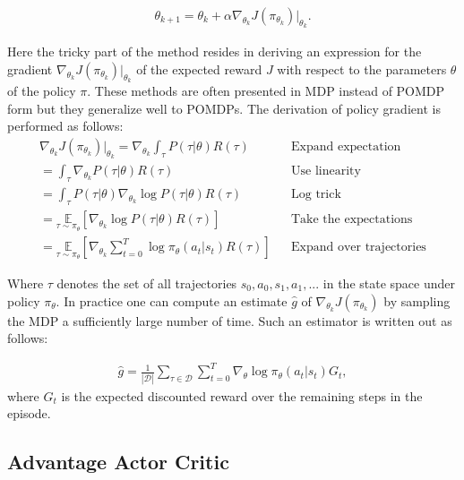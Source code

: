 \begin{align*}
    \theta_{k+1} = \theta_k + \alpha \nabla_{\theta_k} J(\pi_{\theta_k}) \vert_{\theta_k}.
\end{align*}

Here the tricky part of the method resides in deriving an expression for the gradient $\nabla_{\theta_k} J(\pi_{\theta_k}) \vert_{\theta_k}$ of the expected reward $J$ with respect to the parameters $\theta$ of the policy $\pi$. These methods are often presented in MDP instead of POMDP form but they generalize well to POMDPs. The derivation of policy gradient is performed as follows:
\begin{align*}
    \nabla_{\theta_k} J(\pi_{\theta_k}) \vert_{\theta_k} 
    =  \nabla_{\theta_k} \int_\tau P(\tau|\theta)R(\tau)
    && \text{Expand expectation}\\
    =  \int_\tau \nabla_{\theta_k}  P(\tau|\theta)R(\tau)
    && \text{Use linearity}\\
    =  \int_\tau  P(\tau|\theta) \nabla_{\theta_k} \log P(\tau|\theta)R(\tau)
    && \text{Log trick} \\
    =  \underset{\tau \sim \pi_\theta}{\mathbb{E}} \left[\nabla_{\theta_k} \log P(\tau|\theta)R(\tau)\right]
    && \text{Take the expectations}\\
    =  \underset{\tau \sim \pi_\theta}{\mathbb{E}} \left[\nabla_{\theta_k} \sum_{t=0}^T \log \pi_\theta(a_t|s_t)R(\tau)\right]
    && \text{Expand over trajectories}
\end{align*}

Where $\tau$ denotes the set of all trajectories $s_0,a_0,s_1,a_1,...$ in the state space under policy $\pi_\theta$. In practice one can compute an estimate $\hat{g}$ of $\nabla_{\theta_k} J(\pi_{\theta_k})$ by sampling the MDP a sufficiently large number of time. Such an estimator is written out as follows: 

\begin{align*}
    \hat{g} = \frac{1}{|\mathcal{D}|} \sum_{\tau \in \mathcal{D}} \sum_{t=0}^{T} \nabla_\theta \log \pi_\theta (a_t|s_t) G_t,
\end{align*}
where $G_t$ is the expected discounted reward over the remaining steps in the episode.

\subsection{Advantage Actor Critic}

